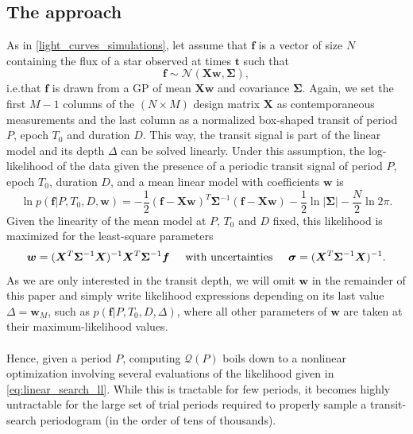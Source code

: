 \documentclass[modern]{aastex631}
\begin{document}
\subsection{The approach}\label{approach}
As in \autoref{light_curves_simulations}, let assume that $\bm{f}$ is a vector of size $N$ containing the flux of a star observed at times $\bm{t}$ such that
\begin{equation*}
    \bm{f} \sim \mathcal{N}(\bm{X w}, \bm{\Sigma}),
\end{equation*}
i.e.\;that $\bm{f}$ is drawn from a GP of mean $\bm{Xw}$ and covariance $\bm{\Sigma}$. Again, we set the first $M-1$ columns of the $(N\times M)$ design matrix $\bm{X}$ as contemporaneous measurements and the last column as a normalized box-shaped transit of period $P$, epoch $T_0$ and duration $D$. This way, the transit signal is part of the linear model and its depth $\Delta$ can be solved linearly. Under this assumption, the log-likelihood of the data given the presence of a periodic transit signal of period $P$, epoch $T_0$, duration $D$, and a mean linear model with coefficients $\bm{w}$ is \citep{Rasmussen2005}
\begin{equation} \label{eq:linear_search_ll}
    \ln p(\bm{f} \vert P, T_0, D, \bm{w}) = -\frac{1}{2}(\bm{f}-\bm{Xw})^T\bm{\Sigma}^{-1}(\bm{f}-\bm{Xw}) -  \frac{1}{2}\ln\vert\bm{\Sigma}\vert - \frac{N}{2}\ln 2\pi.
\end{equation}
Given the linearity of the mean model at $P$, $T_0$ and $D$ fixed, this likelihood is maximized for the least-square parameters
\begin{equation}\label{eq:ls}
    \bm{w} = (\bm{X}^T\bm{\Sigma}^{-1}\bm{X})^{-1}\bm{X}^T\bm{\Sigma}^{-1}\bm{f} \hspace{0.5cm} \text{with  uncertainties} \hspace{0.5cm} \bm{\sigma} = (\bm{X}^T\bm{\Sigma}^{-1}\bm{X})^{-1}.
\end{equation}
As we are only interested in the transit depth, we will omit $\bm{w}$ in the remainder of this paper and simply write likelihood expressions depending on its last value $\Delta=\bm{w}_M$, such as $p(\bm{f} \vert P, T_
0, D, \Delta)$, where all other parameters of $\bm{w}$ are taken at their maximum-likelihood values. \\\\
Hence, given a period $P$, computing $\mathcal{Q}(P)$ boils down to a nonlinear optimization involving several evaluations of the likelihood given in \autoref{eq:linear_search_ll}. While this is tractable for few periods, it becomes highly untractable for the large set of trial periods required to properly sample a transit-search periodogram (in the order of tens of thousands).\\\\
\end{document}
